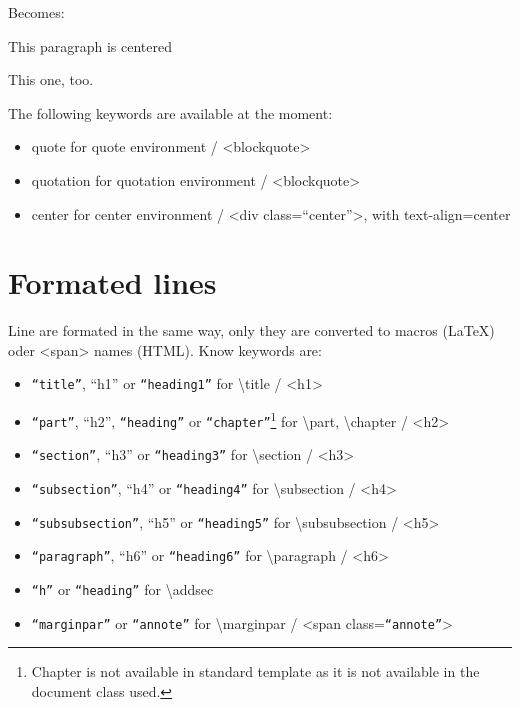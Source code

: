 \documentclass{article}
\begin{document}
{Becomes:\\}

\begin{center}
This paragraph is centered

This one, too.
\end{center}


{The following keywords are available at the moment:\\}

\begin{itemize}
\item quote for quote environment / <blockquote>
\item quotation for quotation environment / <blockquote>
\item center for center environment / <div class=“center”>, with text-align=center
\end{itemize}


\section{Formated lines}
\label{form_lines}

{Line are formated in the same way, only they are converted
to macros (LaTeX) oder <span> names (HTML). Know keywords
are:\\}

\begin{itemize}
\item \texttt{“title”}, “h1” or \texttt{“heading1”} for \textbackslash title / <h1>
\item \texttt{“part”}, “h2”, \texttt{“heading”} or \texttt{“chapter”}\footnote{Chapter is not available in standard template as it is not available in the document class used.}\xspace  for \textbackslash part, \textbackslash chapter / <h2>
\item \texttt{“section”}, “h3” or \texttt{“heading3”} for \textbackslash section / <h3>
\item \texttt{“subsection”}, “h4” or \texttt{“heading4”} for \textbackslash subsection / <h4>
\item \texttt{“subsubsection”}, “h5” or \texttt{“heading5”} for \textbackslash subsubsection / <h5>
\item \texttt{“paragraph”}, “h6” or \texttt{“heading6”} for \textbackslash paragraph / <h6>
\item \texttt{“h”} or \texttt{“heading”} for \textbackslash addsec
\item \texttt{“marginpar”} or \texttt{“annote”} for \textbackslash marginpar / <span class=\texttt{“annote”}>
\end{itemize}
\end{document}
